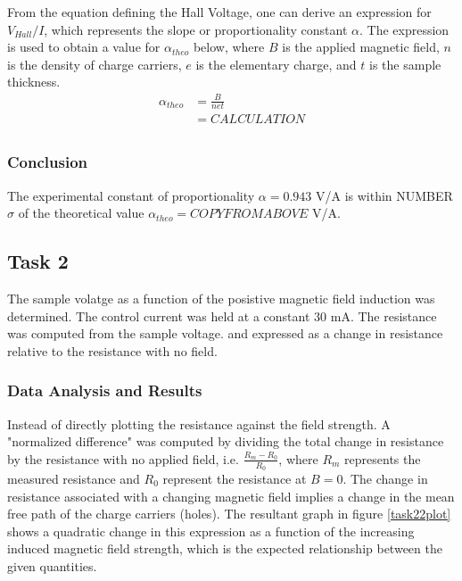 \documentclass[a4paper]{article}
\begin{document}
\begin{figure}[H]
\centering
\label{task21plot}
\end{figure}

From the equation defining the Hall Voltage, one can derive an expression for $V_{Hall}/I$, which represents the slope or proportionality constant $\alpha$. The expression is used to obtain a value for $\alpha_{theo}$ below, where $B$ is the applied magnetic field, $n$ is the density of charge carriers, $e$ is the elementary charge, and $t$ is the sample thickness.
\begin{align*}
\alpha_{theo} &= \frac{B}{net} \\
			  &= CALCULATION \\
\end{align*}

\subsubsection{Conclusion}
The experimental constant of proportionality $\alpha = 0.943 $ V/A is within NUMBER $\sigma$ of the theoretical value $\alpha_{theo} = COPYFROMABOVE$ V/A.

\subsection{Task 2}

\qq The sample volatge as a function of the posistive magnetic field
induction was determined. The control current was held at a constant
30 mA. The resistance was computed from the sample voltage. and expressed as a change in resistance relative to the resistance with no field.

\subsubsection{Data Analysis and Results}
\qq Instead of directly plotting the resistance against the field strength. A "normalized difference" was computed by dividing the total 
change in resistance by the resistance with no applied field, i.e. $\frac{R_m - R_0}{R_0}$, where $R_m$ represents the measured resistance and $R_0$ represent the resistance at $B=0$. The change in resistance associated with a changing magnetic field implies a change in the mean free path of the charge carriers (holes). The resultant graph in figure \ref{task22plot} shows a quadratic change in this expression as a function of the increasing induced magnetic field
strength, which is the expected relationship between the given quantities.
\end{document}
